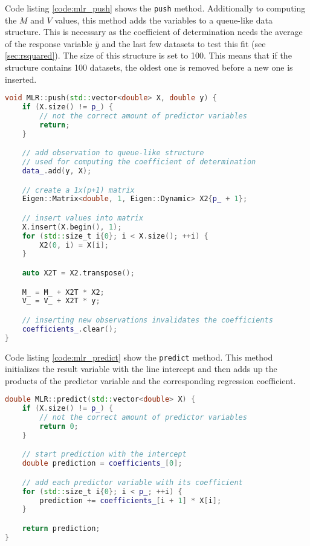 Code listing \vref{code:mlr_push} shows the \lstinline{push} method. Additionally to computing the $ M $ and $ V $ values, this method adds the variables to a queue-like data structure. This is necessary as the coefficient of determination needs the average of the response variable $ \bar{y} $ and the last few datasets to test this fit (see \vref{sec:rsquared}). The size of this structure is set to 100. This means that if the structure contains 100 datasets, the oldest one is removed before a new one is inserted.

\begin{minipage}{\textwidth}
\begin{lstlisting}[caption={C++ method to add new observations to the regression model},captionpos=b,label={code:mlr_push},language=C++]
void MLR::push(std::vector<double> X, double y) {
    if (X.size() != p_) {
        // not the correct amount of predictor variables
        return;
    }

    // add observation to queue-like structure
    // used for computing the coefficient of determination
    data_.add(y, X);

    // create a 1x(p+1) matrix
    Eigen::Matrix<double, 1, Eigen::Dynamic> X2{p_ + 1};

    // insert values into matrix
    X.insert(X.begin(), 1);
    for (std::size_t i{0}; i < X.size(); ++i) {
        X2(0, i) = X[i];
    }

    auto X2T = X2.transpose();

    M_ = M_ + X2T * X2;
    V_ = V_ + X2T * y;

    // inserting new observations invalidates the coefficients
    coefficients_.clear();
}
\end{lstlisting}
\end{minipage}

Code listing \vref{code:mlr_predict} show the \lstinline{predict} method. This method initializes the result variable with the line intercept and then adds up the products of the predictor variable and the corresponding regression coefficient.

\begin{minipage}{\textwidth}
\begin{lstlisting}[caption={C++ method to predict the response variable using the passed predictor variables},captionpos=b,label={code:mlr_predict},language=C++]
double MLR::predict(std::vector<double> X) {
    if (X.size() != p_) {
        // not the correct amount of predictor variables
        return 0;
    }

    // start prediction with the intercept
    double prediction = coefficients_[0];

    // add each predictor variable with its coefficient
    for (std::size_t i{0}; i < p_; ++i) {
        prediction += coefficients_[i + 1] * X[i];
    }

    return prediction;
}
\end{lstlisting}
\end{minipage}

